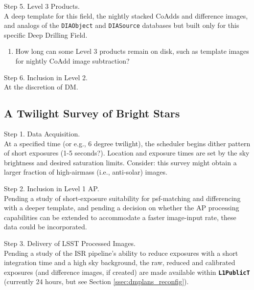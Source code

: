 \documentclass[DM,lsstdraft,toc]{lsstdoc}
\begin{document}
Step 5. Level 3 Products. \\ A deep template for this field, the nightly stacked CoAdds and difference images, and analogs of the {\tt DIAObject} and {\tt DIASource} databases but built only for this specific Deep Drilling Field.
\begin{enumerate}[resume,topsep=-10pt,label= \textbf{Concern \Roman*.}] \item \label{C17} How long can some Level 3 products remain on disk, such as template images for nightly CoAdd image subtraction? \end{enumerate}

Step 6. Inclusion in Level 2. \\ At the discretion of DM.


\subsection{A Twilight Survey of Bright Stars}\label{ssec:SPCS_Twilight}

Step 1. Data Acquisition. \\ At a specified time (or e.g., 6 degree twilight), the scheduler begins dither pattern of short exposures (1-5 seconds?). Location and exposure times are set by the sky brightness and desired saturation limits. Consider: this survey might obtain a larger fraction of high-airmass (i.e., anti-solar) images.

Step 2. Inclusion in Level 1 AP. \\ Pending a study of short-exposure suitability for psf-matching and differencing with a deeper template, and pending a decision on whether the AP processing capabilities can be extended to accommodate a faster image-input rate, these data could be incorporated.

Step 3. Delivery of LSST Processed Images. \\ Pending a study of the ISR pipeline's ability to reduce exposures with a short integration time and a high sky background, the raw, reduced and calibrated exposures (and difference images, if created) are made available within {\tt \textbf{L1PublicT}} (currently 24 hours, but see Section \ref{ssec:dmplans_reconfig}).
\end{document}
